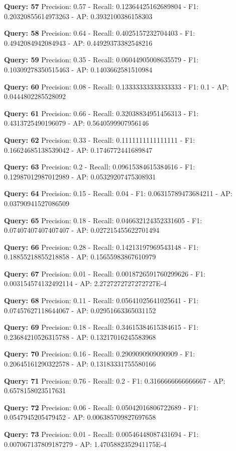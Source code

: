 \documentclass[a4paper, 11pt]{article}
\begin{document}
\textbf{Query: 57}
Precision: 0.57 - Recall: 0.12364425162689804 - F1: 0.20320855614973263 - AP:  0.3932100386158303

\textbf{Query: 58}
Precision: 0.64 - Recall: 0.4025157232704403 - F1: 0.4942084942084943 - AP:  0.44929373382548216

\textbf{Query: 59}
Precision: 0.35 - Recall: 0.06044905008635579 - F1: 0.10309278350515463 - AP:  0.1403662581510984

\textbf{Query: 60}
Precision: 0.08 - Recall: 0.13333333333333333 - F1: 0.1 - AP:  0.0444802285528092

\textbf{Query: 61}
Precision: 0.66 - Recall: 0.32038834951456313 - F1: 0.4313725490196079 - AP:  0.5640599907956146

\textbf{Query: 62}
Precision: 0.33 - Recall: 0.1111111111111111 - F1: 0.16624685138539042 - AP:  0.1746772441689847

\textbf{Query: 63}
Precision: 0.2 - Recall: 0.09615384615384616 - F1: 0.12987012987012989 - AP:  0.05329207475308931

\textbf{Query: 64}
Precision: 0.15 - Recall: 0.04 - F1: 0.06315789473684211 - AP:  0.03790941527086509

\textbf{Query: 65}
Precision: 0.18 - Recall: 0.046632124352331605 - F1: 0.07407407407407407 - AP:  0.027215455622701494

\textbf{Query: 66}
Precision: 0.28 - Recall: 0.14213197969543148 - F1: 0.18855218855218858 - AP:  0.15655983867610979

\textbf{Query: 67}
Precision: 0.01 - Recall: 0.0018726591760299626 - F1: 0.003154574132492114 - AP:  2.2727272727272727E-4

\textbf{Query: 68}
Precision: 0.11 - Recall: 0.05641025641025641 - F1: 0.07457627118644067 - AP:  0.02951663365031152

\textbf{Query: 69}
Precision: 0.18 - Recall: 0.34615384615384615 - F1: 0.23684210526315788 - AP:  0.13217016245583968

\textbf{Query: 70}
Precision: 0.16 - Recall: 0.2909090909090909 - F1: 0.20645161290322578 - AP:  0.13183331755580166

\textbf{Query: 71}
Precision: 0.76 - Recall: 0.2 - F1: 0.3166666666666667 - AP: 0.6578158023517631

\textbf{Query: 72}
Precision: 0.06 - Recall: 0.05042016806722689 - F1: 0.0547945205479452 - AP:  0.006385709827697658

\textbf{Query: 73}
Precision: 0.01 - Recall: 0.00546448087431694 - F1: 0.007067137809187279 - AP:  1.4705882352941175E-4
\end{document}
